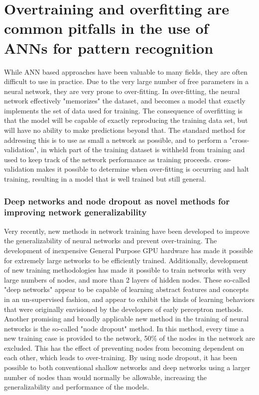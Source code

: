 \section{Overtraining and overfitting are common pitfalls in the use of ANNs for pattern recognition}
\label{sec:intro_overtraining}
While ANN based approaches have been valuable to many fields, they are often difficult to use in practice.
Due to the very large number of free parameters in a neural network, they are very prone to over-fitting.
In over-fitting, the neural network effectively "memorizes" the dataset, and becomes a model that exactly implements the set of data used for training\citep{Tetko:1995cm}.
The consequence of overfitting is that the model will be capable of exactly reproducing the training data set, but will have no ability to make predictions beyond that.
The standard method for addressing this is to use as small a network as possible, and to perform a "cross-validation", in which part of the training dataset is withheld from training and used to keep track of the network performance as training proceeds.
cross-validation makes it possible to determine when over-fitting is occurring and halt training, resulting in a model that is well trained but still general.

\subsubsection{Deep networks and node dropout as novel methods for improving network generalizability}
Very recently, new methods in network training have been developed to improve the generalizability of neural networks and prevent over-training.
The development of inexpensive General Purpose GPU hardware has made it possible for extremely large networks to be efficiently trained. 
Additionally, development of new training methodologies\citep{Hinton:2006dy} has made it possible to train networks with very large numbers of nodes, and more than 2 layers of hidden nodes.
These so-called "deep networks" appear to be capable of learning abstract features and concepts in an un-supervised fashion\citep{Le:2013kz}, and appear to exhibit the kinds of learning behaviors that were originally envisioned by the developers of early perceptron methods. 
Another promising and broadly applicable new method in the training of neural networks is the so-called "node dropout" method.
In this method, every time a new training case is provided to the network, 50\% of the nodes in the network are excluded.
This has the effect of preventing nodes from becoming dependent on each other, which leads to over-training.
By using node dropout, it has been possible to both conventional shallow networks and deep networks using a larger number of nodes than would normally be allowable, increasing the generalizability and performance of the models\citep{Hinton:2012tv}.

